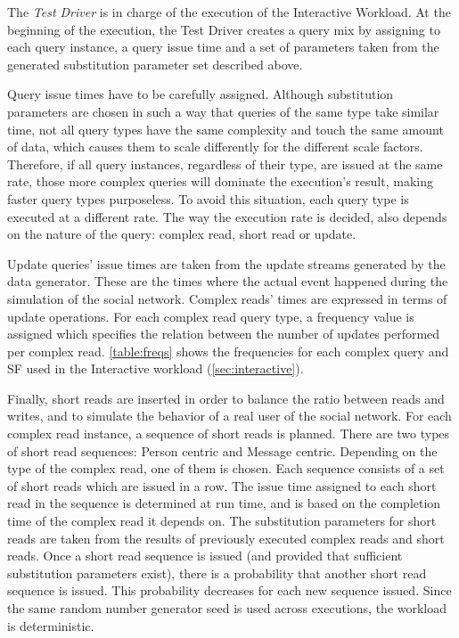 The \emph{Test Driver} is in charge of the execution of the Interactive Workload.
At the beginning of the execution, the Test Driver creates a query mix by
assigning to each query instance, a query issue time and a set of parameters
taken from the generated substitution parameter set described above.  

Query issue times have to be carefully assigned.  Although substitution
parameters are chosen in such a way that queries of the same type take similar
time, not all query types have the same complexity and touch the same amount of
data, which causes them to scale differently for the different scale factors.
Therefore, if all query instances, regardless of their type, are issued
at the same rate, those more complex queries will dominate the execution's
result, making faster query types purposeless. To avoid this situation, each
query type is executed at a different rate. The way the execution rate is decided,
also depends on the nature of the query: complex read, short read or update.

Update queries' issue times are taken from the update streams generated by the
data generator. These are the times where the actual event happened during the
simulation of the social network. Complex reads' times are expressed in terms
of update operations. For each complex read query type, a frequency value is
assigned which specifies the relation between the number of updates performed
per complex read. \autoref{table:freqs} shows the frequencies for each complex query and SF used in the Interactive workload (\autoref{sec:interactive}).




Finally, short reads are inserted in order to balance the ratio between reads
and writes, and to simulate the behavior of a real user of the social network.
For each complex read instance, a sequence of short reads is planned. There are two
types of short read sequences: Person centric and Message centric. Depending on
the type of the complex read, one of them is chosen. Each sequence consists of
a set of short reads which are issued in a row. The issue time assigned to each
short read in the sequence is determined at run time, and is based on the
completion time of the complex read it depends on. 
The substitution parameters for short reads are taken from the results of previously
executed complex reads and short reads.
Once a short read sequence is issued (and provided that sufficient substitution parameters 
exist), there is a probability that another short read  sequence is issued. 
This probability decreases for each new sequence issued. 
Since the same random number generator seed is used across
executions, the workload is deterministic.


